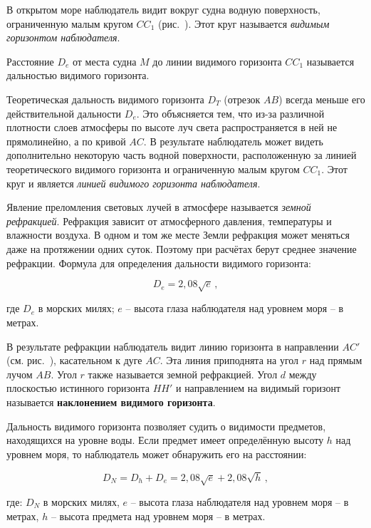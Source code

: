 В открытом море наблюдатель видит вокруг судна водную поверхность,
ограниченную малым кругом $CC_1$ (рис.~). Этот круг называется
\textit{видимым горизонтом наблюдателя}.

Расстояние $D_e$ от места судна $M$ до линии видимого горизонта $CC_1$
называется дальностью видимого горизонта.

Теоретическая дальность видимого горизонта $D_T$ (отрезок $AB$) всегда
меньше его действительной дальности $D_e$. Это объясняется тем, что
из-за различной плотности слоев атмосферы по высоте луч света
распространяется в ней не прямолинейно, а по кривой $AC$. В результате
наблюдатель может видеть дополнительно некоторую часть водной
поверхности, расположенную за линией теоретического видимого горизонта
и ограниченную малым кругом $CC_1$. Этот круг и является \textit{линией
видимого горизонта наблюдателя}.

Явление преломления световых лучей в атмосфере называется
\textit{земной рефракцией}. Рефракция зависит
от атмосферного давления, температуры и влажности воздуха. В одном и
том же месте Земли рефракция может меняться даже на протяжении одних
суток. Поэтому при расчётах берут среднее значение рефракции. Формула
для определения дальности видимого горизонта:

\begin{equation}
  D_e = 2,08 \sqrt{e} \, ,
\end{equation}

где $D_e$ в морских милях; $e$ \--- высота глаза наблюдателя над
уровнем моря \--- в метрах.

В результате рефракции наблюдатель видит линию горизонта в направлении
$AC'$ (см. рис.~), касательном к дуге $AC$. Эта линия
приподнята на угол $r$ над прямым лучом $AB$. Угол $r$ также
называется земной рефракцией. Угол $d$ между плоскостью истинного
горизонта $HH'$ и направлением на видимый горизонт называется
\textbf{наклонением видимого горизонта}.

Дальность видимого горизонта позволяет судить о видимости предметов,
находящихся на уровне воды. Если предмет имеет определённую высоту $h$
над уровнем моря, то наблюдатель может обнаружить его на расстоянии:

\begin{equation}
  D_N = D_h + D_e = 2,08 \sqrt{e} + 2,08 \sqrt{h} \, , 
\end{equation}

где: $D_N$ в морских милях, $e$ \--- высота глаза наблюдателя над
уровнем моря \--- в метрах, $h$ \--- высота предмета над уровнем моря
\--- в метрах.

